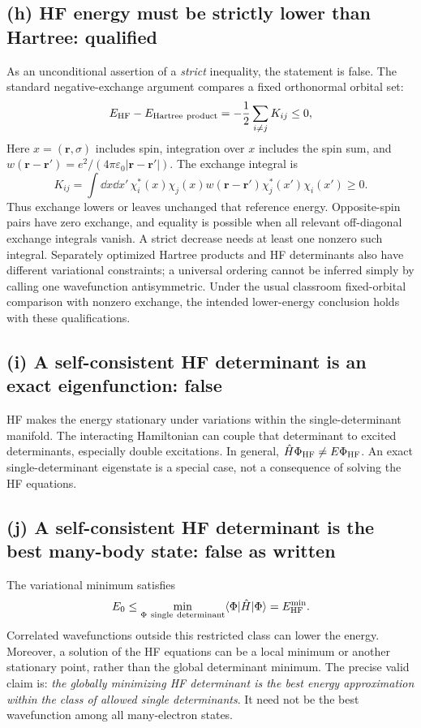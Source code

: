 \subsection*{(h) HF energy must be strictly lower than Hartree: qualified}
As an unconditional assertion of a \emph{strict} inequality, the statement is false. The standard negative-exchange argument compares a fixed orthonormal orbital set:
\[
E_{\rm HF}-E_{\rm Hartree\ product}
=-\frac12\sum_{i\ne j}K_{ij}\leq0,
\]
Here $x=(\mathbf r,\sigma)$ includes spin, integration over $x$ includes the spin sum, and $w(\mathbf r-\mathbf r')=e^2/(4\pi\varepsilon_0|\mathbf r-\mathbf r'|)$. The exchange integral is
\[
K_{ij}=\int\dd x\dd x'\,
\chi_i^*(x)\chi_j(x)w(\mathbf r-\mathbf r')\chi_j^*(x')\chi_i(x')\geq0.
\]
Thus exchange lowers or leaves unchanged that reference energy. Opposite-spin pairs have zero exchange, and equality is possible when all relevant off-diagonal exchange integrals vanish. A strict decrease needs at least one nonzero such integral. Separately optimized Hartree products and HF determinants also have different variational constraints; a universal ordering cannot be inferred simply by calling one wavefunction antisymmetric. Under the usual classroom fixed-orbital comparison with nonzero exchange, the intended lower-energy conclusion holds with these qualifications.

\subsection*{(i) A self-consistent HF determinant is an exact eigenfunction: false}
HF makes the energy stationary under variations within the single-determinant manifold. The interacting Hamiltonian can couple that determinant to excited determinants, especially double excitations. In general,
$\hat H\Phi_{\rm HF}\neq E\Phi_{\rm HF}$.
An exact single-determinant eigenstate is a special case, not a consequence of solving the HF equations.

\subsection*{(j) A self-consistent HF determinant is the best many-body state: false as written}
The variational minimum satisfies
\[
E_0\leq\min_{\Phi\ {\rm single\ determinant}}\langle\Phi|\hat H|\Phi\rangle
=E_{\rm HF}^{\min}.
\]
Correlated wavefunctions outside this restricted class can lower the energy. Moreover, a solution of the HF equations can be a local minimum or another stationary point, rather than the global determinant minimum. The precise valid claim is: \emph{the globally minimizing HF determinant is the best energy approximation within the class of allowed single determinants}. It need not be the best wavefunction among all many-electron states.

